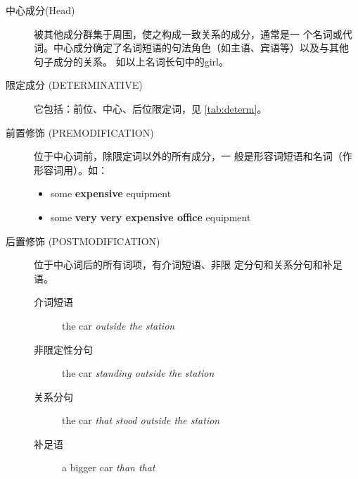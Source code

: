 \begin{description}
\item[中心成分(Head)] 被其他成分群集于周围，使之构成一致关系的成分，通常是一
  个名词或代词。中心成分确定了名词短语的句法角色（如主语、宾语等）以及与其他
  句子成分的关系。 如以上名词长句中的girl。

\item[限定成分 (DETERMINATIVE)] 它包括：前位、中心、后位限定词，见 \cref{tab:determ}。

\item[前置修饰 (PREMODIFICATION)] 位于中心词前，除限定词以外的所有成分，一
  般是形容词短语和名词（作形容词用）。如：
  \begin{itemize}
  \item some \textbf{expensive} equipment
  \item some \textbf{very very expensive office} equipment
  \end{itemize}

\item[后置修饰 (POSTMODIFICATION)] 位于中心词后的所有词项，有介词短语、非限
  定分句和关系分句和补足语。
  \begin{description}
  \item[介词短语] the car \emph{outside the station}
  \item[非限定性分句] the car \emph{standing outside the station}
  \item[关系分句] the car \emph{that stood outside the station}
  \item[补足语] a bigger car \emph{than that}
  \end{description}
\end{description}












